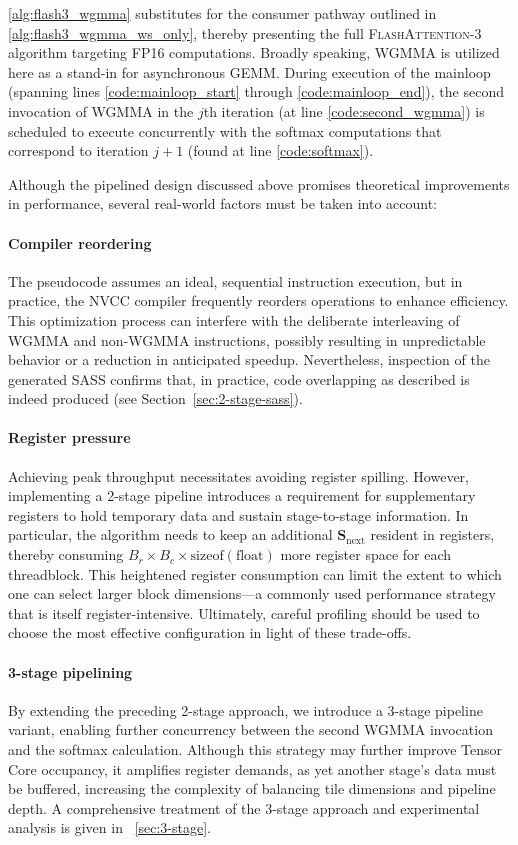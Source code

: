 \cref{alg:flash3_wgmma} substitutes for the consumer pathway outlined in \cref{alg:flash3_wgmma_ws_only}, thereby presenting the full \textsc{FlashAttention-3} algorithm targeting FP16 computations. Broadly speaking, WGMMA is utilized here as a stand-in for asynchronous GEMM. During execution of the mainloop (spanning lines \ref{code:mainloop_start} through \ref{code:mainloop_end}), the second invocation of WGMMA in the $j$th iteration (at line \ref{code:second_wgmma}) is scheduled to execute concurrently with the softmax computations that correspond to iteration $j+1$ (found at line \ref{code:softmax}).

Although the pipelined design discussed above promises theoretical improvements in performance, several real-world factors must be taken into account:
\paragraph{Compiler reordering} The pseudocode assumes an ideal, sequential instruction execution, but in practice, the NVCC compiler frequently reorders operations to enhance efficiency. This optimization process can interfere with the deliberate interleaving of WGMMA and non-WGMMA instructions, possibly resulting in unpredictable behavior or a reduction in anticipated speedup. Nevertheless, inspection of the generated SASS confirms that, in practice, code overlapping as described is indeed produced (see Section~\ref{sec:2-stage-sass}).
\paragraph{Register pressure} Achieving peak throughput necessitates avoiding register spilling. However, implementing a 2-stage pipeline introduces a requirement for supplementary registers to hold temporary data and sustain stage-to-stage information. In particular, the algorithm needs to keep an additional $\mathbf{S}_{\mathrm{next}}$ resident in registers, thereby consuming $B_r \times B_c \times \text{sizeof}(\text{float})$ more register space for each threadblock. This heightened register consumption can limit the extent to which one can select larger block dimensions—a commonly used performance strategy that is itself register-intensive. Ultimately, careful profiling should be used to choose the most effective configuration in light of these trade-offs.
\paragraph{3-stage pipelining} By extending the preceding 2-stage approach, we introduce a 3-stage pipeline variant, enabling further concurrency between the second WGMMA invocation and the softmax calculation. Although this strategy may further improve Tensor Core occupancy, it amplifies register demands, as yet another stage’s data must be buffered, increasing the complexity of balancing tile dimensions and pipeline depth. A comprehensive treatment of the 3-stage approach and experimental analysis is given in ~\cref{sec:3-stage}.

